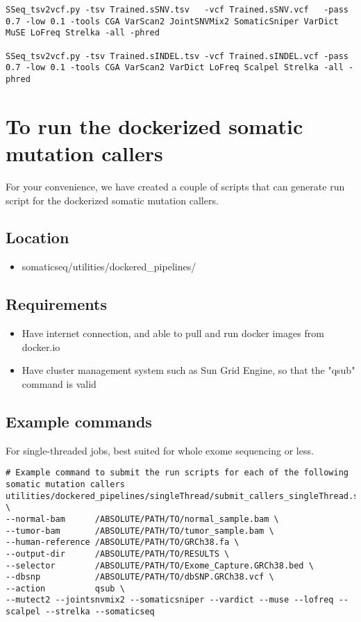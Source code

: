 \documentclass[10pt,letterpaper]{article}
\begin{document}
\begin{sloppypar}
\begin{lstlisting}
SSeq_tsv2vcf.py -tsv Trained.sSNV.tsv   -vcf Trained.sSNV.vcf   -pass 0.7 -low 0.1 -tools CGA VarScan2 JointSNVMix2 SomaticSniper VarDict MuSE LoFreq Strelka -all -phred

SSeq_tsv2vcf.py -tsv Trained.sINDEL.tsv -vcf Trained.sINDEL.vcf -pass 0.7 -low 0.1 -tools CGA VarScan2 VarDict LoFreq Scalpel Strelka -all -phred
\end{lstlisting}



\section{To run the dockerized somatic mutation callers}

For your convenience, we have created a couple of scripts that can generate run script for the dockerized somatic mutation callers. 

\subsection{Location}

  \begin{itemize}
    \item somaticseq/utilities/dockered\_pipelines/
  \end{itemize}

\subsection{Requirements}

  \begin{itemize}
    \item Have internet connection, and able to pull and run docker images from docker.io
    \item Have cluster management system such as Sun Grid Engine, so that the "qsub" command is valid
  \end{itemize}


\subsection{Example commands}

For single-threaded jobs, best suited for whole exome sequencing or less. 

\begin{lstlisting}
# Example command to submit the run scripts for each of the following somatic mutation callers
utilities/dockered_pipelines/singleThread/submit_callers_singleThread.sh \
--normal-bam      /ABSOLUTE/PATH/TO/normal_sample.bam \
--tumor-bam       /ABSOLUTE/PATH/TO/tumor_sample.bam \
--human-reference /ABSOLUTE/PATH/TO/GRCh38.fa \
--output-dir      /ABSOLUTE/PATH/TO/RESULTS \
--selector        /ABSOLUTE/PATH/TO/Exome_Capture.GRCh38.bed \
--dbsnp           /ABSOLUTE/PATH/TO/dbSNP.GRCh38.vcf \
--action          qsub \
--mutect2 --jointsnvmix2 --somaticsniper --vardict --muse --lofreq --scalpel --strelka --somaticseq
\end{lstlisting}



\end{sloppypar}
\end{document}
